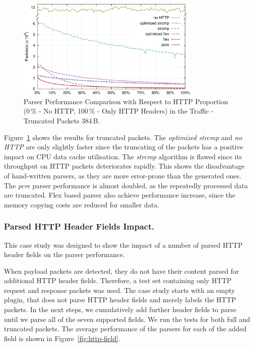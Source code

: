\begin{figure}[tb]
        \centering
        \includegraphics[width=0.8\textwidth]{figures/paper-http/384_pcap_norm_1}
        \caption{Parser Performance Comparison with Respect to HTTP Proportion (0\,\% - No HTTP, 100\,\% - Only HTTP Headers) in the Traffic - Truncated Packets 384\,B.}
        \label{fig:http-pcap_384}
\end{figure}

Figure~\ref{fig:http-pcap_384} shows the results for truncated packets. The \emph{optimized strcmp} and \emph{no HTTP} are only slightly faster since the truncating of the packets has a positive impact on CPU data cache utilisation. The \emph{strcmp} algorithm is flawed since its throughput on HTTP packets deteriorates rapidly. This shows the disadvantage of hand-written parsers, as they are more error-prone than the generated ones. The \emph{pcre} parser performance is almost doubled, as the repeatedly processed data are truncated. Flex based parser also achieve performance increase, since the memory copying costs are reduced for smaller data.

\subsubsection*{Parsed HTTP Header Fields Impact.}

This case study was designed to show the impact of a number of parsed HTTP header fields on the parser performance. 

When payload packets are detected, they do not have their content parsed for additional HTTP header fields. Therefore, a test set containing only HTTP request and response packets was used. The case study starts with an empty plugin, that does not parse HTTP header fields and merely labels the HTTP packets. In the next steps, we cumulatively add further header fields to parse until we parse all of the seven supported fields. We run the tests for both full and truncated packets. The average performance of the parsers for each of the added field is shown in Figure~\ref{fig:http-field}.

